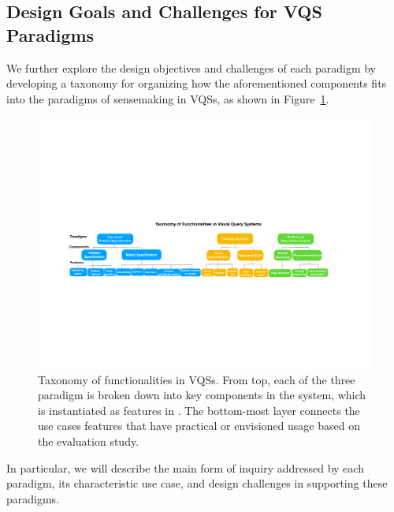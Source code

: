 \subsection{Design Goals and Challenges for VQS Paradigms}
We further explore the design objectives and challenges of each paradigm by developing a taxonomy for organizing how the aforementioned components fits into the paradigms of sensemaking in VQSs, as shown in Figure~\ref{fig:taxonomy}.
\begin{figure}[ht!]
  \centering
  \includegraphics[width=0.9\linewidth]{figures/full_taxonomy.pdf}
  \caption{Taxonomy of functionalities in VQSs. From top, each of the three paradigm is broken down into key components in the system, which is instantiated as features in \zv. The bottom-most layer connects the use cases features that have practical or envisioned usage based on the evaluation study.}
  \label{fig:taxonomy}
\end{figure}
In particular, we will describe the main form of inquiry addressed by each paradigm, its characteristic use case, and design challenges in supporting these paradigms.
